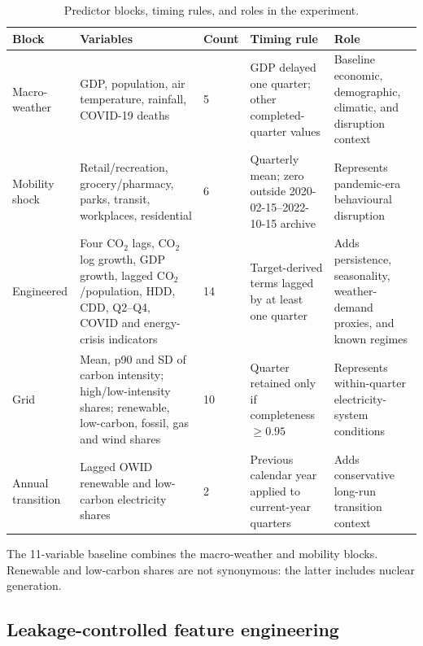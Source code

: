 \documentclass[preprint,12pt]{elsarticle}
\newcommand{\coo}{CO$_2$}
\begin{document}
\begin{table}[H]
\centering
\caption{Predictor blocks, timing rules, and roles in the experiment.}
\label{tab:data_blocks}
\scriptsize
\begin{threeparttable}
\begin{tabularx}{\textwidth}{@{}p{1.7cm}p{4.4cm}p{0.8cm}p{3.0cm}Y@{}}
\toprule
Block & Variables & Count & Timing rule & Role \\
\midrule
Macro-weather & GDP, population, air temperature, rainfall, COVID-19 deaths & 5 & GDP delayed one quarter; other completed-quarter values & Baseline economic, demographic, climatic, and disruption context \\
Mobility shock & Retail/recreation, grocery/pharmacy, parks, transit, workplaces, residential & 6 & Quarterly mean; zero outside 2020-02-15--2022-10-15 archive & Represents pandemic-era behavioural disruption \\
Engineered & Four \coo{} lags, \coo{} log growth, GDP growth, lagged \coo{}/population, HDD, CDD, Q2--Q4, COVID and energy-crisis indicators & 14 & Target-derived terms lagged by at least one quarter & Adds persistence, seasonality, weather-demand proxies, and known regimes \\
Grid & Mean, p90 and SD of carbon intensity; high/low-intensity shares; renewable, low-carbon, fossil, gas and wind shares & 10 & Quarter retained only if completeness $\geq0.95$ & Represents within-quarter electricity-system conditions \\
Annual transition & Lagged OWID renewable and low-carbon electricity shares & 2 & Previous calendar year applied to current-year quarters & Adds conservative long-run transition context \\
\bottomrule
\end{tabularx}
\begin{tablenotes}[flushleft]\footnotesize
\item The 11-variable baseline combines the macro-weather and mobility blocks. Renewable and low-carbon shares are not synonymous: the latter includes nuclear generation.
\end{tablenotes}
\end{threeparttable}
\end{table}

\subsection{Leakage-controlled feature engineering}
\end{document}
